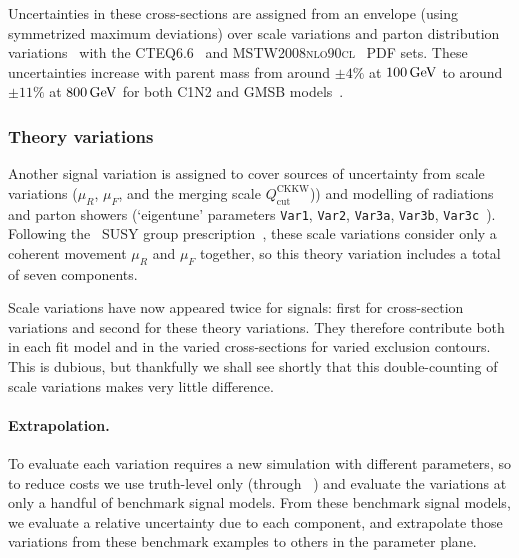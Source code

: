 Uncertainties in these cross-sections are assigned from an envelope
(using symmetrized maximum deviations)
over scale variations and parton distribution variations~\cite{Fuks:2012qx}
with the
\textsc{CTEQ6.6}~\cite{Nadolsky:2008cw} and
\textsc{MSTW2008nlo90cl}~\cite{Martin:2009iq} PDF sets.
These uncertainties increase with parent mass from around
$\pm4\%$ at $100\,\eV[G]$ to around
$\pm11\%$ at $800\,\eV[G]$ for both C1N2 and GMSB models~\cite{
atlas_twiki_xsec_c1n2,
atlas_twiki_xsec_hino
}.

\subsubsection{Theory variations}
\label{sec:2ljets_theory_variations}
Another signal variation is assigned to cover sources of uncertainty from
scale variations ($\mu_R$, $\mu_F$, and the merging scale
$Q_\textrm{cut}^\textrm{CKKW}$)) and modelling of radiations and parton
showers (`eigentune' parameters
\texttt{Var1},
\texttt{Var2},
\texttt{Var3a},
\texttt{Var3b},
\texttt{Var3c}~\cite{ATL-PHYS-PUB-2014-021}).
Following the \atlas\ SUSY group
prescription~\cite{atlas_twiki_susytheoretical},
these scale variations consider only a coherent movement $\mu_R$ and $\mu_F$
together, so this theory variation includes a total of seven components.

Scale variations have now appeared twice for signals:
first for cross-section variations and second for these theory variations.
They therefore contribute both in each fit model and in the varied
cross-sections for varied exclusion contours.
This is dubious, but thankfully we shall see shortly that this double-counting
of scale variations makes very little difference.

\paragraph{Extrapolation.}
To evaluate each variation requires a new simulation with different parameters,
so to reduce costs we use truth-level only
(through \simpleanalysis~\cite{simpleanalysis_cern}) and evaluate the
variations at only a handful of benchmark signal models.
From these benchmark signal models, we evaluate a relative uncertainty due
to each component, and extrapolate those variations from these benchmark
examples to others in the parameter plane.

